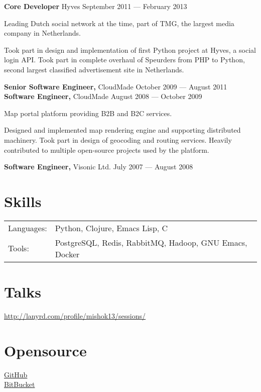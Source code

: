 \documentclass[margin]{res}
\begin{document}
\begin{resume}
{\bf Core Developer} Hyves \hfill September 2011 --- February 2013

Leading Dutch social network at the time, part of TMG, the largest
media company in Netherlands.

Took part in design and implementation of first Python project at
Hyves, a social login API. Took part in complete overhaul of Speurders
from PHP to Python, second largest classified advertisement site in
Netherlands.

{\bf Senior Software Engineer,} CloudMade \hfill October 2009 --- August 2011\\
{\bf Software Engineer,} CloudMade \hfill August 2008 --- October 2009

Map portal platform providing B2B and B2C services.

Designed and implemented map rendering engine and supporting
distributed machinery. Took part in design of geocoding and routing
services. Heavily contributed to multiple open-source projects used by
the platform.

{\bf Software Engineer,} Visonic Ltd. \hfill July 2007 --- August 2008





\section{Skills}
\begin{tabular}{l p{5in}}
  Languages: & Python, Clojure, Emacs Lisp, C \\
  Tools: & PostgreSQL, Redis, RabbitMQ, Hadoop, GNU Emacs, Docker \\
\end{tabular}

\section{Talks}

\href{http://lanyrd.com/profile/mishok13/sessions/}{http://lanyrd.com/profile/mishok13/sessions/}

\section{Opensource}

\href{https://github.com/mishok13}{GitHub}\\
\href{https://bitbucket.org/mishok13}{BitBucket}

\end{resume}
\end{document}
